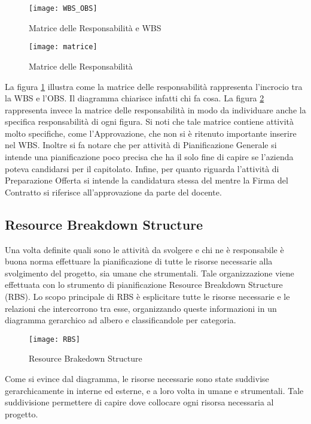 \clearpage

\begin{figure}[!h]
  \texttt{[image: WBS\_OBS]}
	\caption{Matrice delle Responsabilità e WBS}
	\label{fig: WBS_OBS}
\end{figure} 

\clearpage
\begin{figure}[!h]
  \texttt{[image: matrice]}
  	\label{fig: MATR}
	\caption{Matrice delle Responsabilità}
\end{figure}

La figura \ref{fig: WBS_OBS} illustra come la matrice delle responsabilità rappresenta l'incrocio tra la WBS e l'OBS. Il diagramma chiarisce infatti chi fa cosa.
La figura \ref{fig: MATR} rappresenta invece la matrice delle responsabilità in modo da individuare anche la specifica responsabilità di ogni figura. Si noti che tale matrice contiene attività molto specifiche, come l'Approvazione, che non si è ritenuto importante inserire nel WBS. Inoltre si fa notare che per attività di Pianificazione Generale si intende una pianificazione poco precisa che ha il solo fine di capire se l'azienda poteva candidarsi per il capitolato. Infine, per quanto riguarda l'attività di Preparazione Offerta si intende la candidatura stessa del  mentre la Firma del Contratto si riferisce all'approvazione da parte del docente.



\subsection{Resource Breakdown Structure}
Una volta definite quali sono le attività da svolgere e chi ne è responsabile è buona norma effettuare la pianificazione di tutte le risorse necessarie alla svolgimento del progetto, sia umane che strumentali.
Tale organizzazione viene effettuata con lo strumento di pianificazione Resource Breakdown Structure (RBS).
Lo scopo principale di RBS è esplicitare tutte le risorse necessarie e le relazioni che intercorrono tra esse, organizzando queste informazioni in un diagramma gerarchico ad albero e classificandole per categoria.


\begin{figure}[!h]
  \texttt{[image: RBS]}
  	\label{fig:RBS}
	\caption{Resource Brakedown Structure}
\end{figure}




Come si evince dal diagramma, le risorse necessarie sono state suddivise gerarchicamente in interne ed esterne, e a loro volta in umane e strumentali. Tale suddivisione permettere di capire dove collocare ogni risorsa necessaria al progetto.


